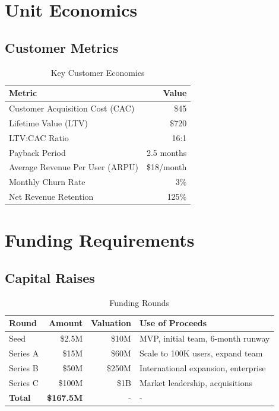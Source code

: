 \section{Unit Economics}

\subsection{Customer Metrics}

\begin{table}[H]
\centering
\caption{Key Customer Economics}
\begin{tabular}{|l|r|}
\hline
\rowcolor{lightgray}
\textbf{Metric} & \textbf{Value} \\
\hline
Customer Acquisition Cost (CAC) & \$45 \\
\hline
Lifetime Value (LTV) & \$720 \\
\hline
LTV:CAC Ratio & 16:1 \\
\hline
Payback Period & 2.5 months \\
\hline
Average Revenue Per User (ARPU) & \$18/month \\
\hline
Monthly Churn Rate & 3\% \\
\hline
Net Revenue Retention & 125\% \\
\hline
\end{tabular}
\end{table}

\section{Funding Requirements}

\subsection{Capital Raises}

\begin{table}[H]
\centering
\caption{Funding Rounds}
\begin{tabular}{|l|r|r|p{5cm}|}
\hline
\rowcolor{lightgray}
\textbf{Round} & \textbf{Amount} & \textbf{Valuation} & \textbf{Use of Proceeds} \\
\hline
Seed & \$2.5M & \$10M & MVP, initial team, 6-month runway \\
\hline
Series A & \$15M & \$60M & Scale to 100K users, expand team \\
\hline
Series B & \$50M & \$250M & International expansion, enterprise \\
\hline
Series C & \$100M & \$1B & Market leadership, acquisitions \\
\hline
\textbf{Total} & \textbf{\$167.5M} & - & - \\
\hline
\end{tabular}
\end{table}

